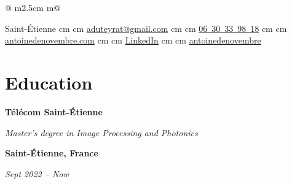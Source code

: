 \documentclass[10pt, letterpaper]{article}
\newenvironment{twocolentry}[2][]{
    \onecolentry
    \def\secondColumn{#2}
    \setcolumnwidth{\fill, 6 cm}
    \begin{paracol}{2}
}{
    \switchcolumn \raggedleft \secondColumn
    \end{paracol}
    \endonecolentry
} %
\newenvironment{header}{
    \setlength{\topsep}{0pt}\par\kern\topsep\centering\linespread{1.5}
}{
    \par\kern\topsep
} %
\let\hrefWithoutArrow\href
\renewcommand{\href}[2]{\hrefWithoutArrow{#1}{\ifthenelse{\equal{#2}{}}{ }{#2 }\raisebox{.15ex}{\footnotesize \faExternalLink*}}}
\begin{document}
\begin{header}
\begin{tabular}{@{} m{2.5cm}  m{\dimexpr\textwidth-2.5cm}@{} }
\begin{minipage}[t]{\linewidth}
            \normalsize
            \mbox{{\color{black}\footnotesize\faMapMarker*}\hspace*{0.13cm}Saint-Étienne}%
             cm%
            \AND%
             cm%
            \mbox{\hrefWithoutArrow{mailto:aduteyrat@gmail.com}{\color{black}{\footnotesize\faEnvelope[regular]}\hspace*{0.13cm}aduteyrat@gmail.com}}%
             cm%
            \AND%
             cm%
            \mbox{\hrefWithoutArrow{tel:+33-06-30-33-98-18}{\color{black}{\footnotesize\faPhone*}\hspace*{0.13cm}06 30 33 98 18}}%
             cm%
            \AND%
             cm%
            \mbox{\hrefWithoutArrow{https://antoinedenovembre.com/}{\color{black}{\footnotesize\faLink}\hspace*{0.13cm}antoinedenovembre.com}}%
             cm%
            \AND%
             cm%
            \mbox{\hrefWithoutArrow{https://linkedin.com/in/antoine-duteyrat/}{\color{black}{\footnotesize\faLinkedinIn}\hspace*{0.13cm}LinkedIn}}%
             cm%
            \AND%
             cm%
            \mbox{\hrefWithoutArrow{https://github.com/antoinedenovembre}{\color{black}{\footnotesize\faGithub}\hspace*{0.13cm}antoinedenovembre}}%
        \end{minipage}
    \end{tabular}
    \end{header}

    
    \vspace*{-0.5cm}
    \section{Education}
        \begin{twocolentry}{
			\textbf{Saint-Étienne, France}

			\textit{Sept 2022 – Now}}
            \textbf{Télécom Saint-Étienne}

            \textit{Master’s degree in Image Processing and Photonics}
        \end{twocolentry}
\end{document}
